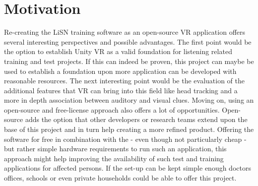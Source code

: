 \documentclass[a4paper,11pt]{article}%
\renewcommand{\\}{\vspace*{0.5\baselineskip} \newline}
\begin{document}
\section{Motivation}
\label{sec:motivation}
Re-creating the \ac{LiSN} training software as an open-source \ac{VR} application offers several interesting perspectives and possible advantages. The first point would be the option to establish Unity \ac{VR} as a valid foundation for listening related training and test projects. If this can indeed be proven, this project can maybe be used to establish a foundation upon more application can be developed with reasonable resources.
\newline
\newline
The next interesting point would be the evaluation of the additional features that \ac{VR} can bring into this field like head tracking and a more in depth association between auditory and visual clues.
\newline
\newline
Moving on, using an open-source and free-license approach also offers a lot of opportunities. Open-source adds the option that other developers or research teams extend upon the base of this project and in turn help creating a more refined product.
\newline
\newline
Offering the software for free in combination with the - even though not particularly cheap - but rather simple hardware requirements to run such an application, this approach might help improving the availability of such test and training applications for affected persons. If the set-up can be kept simple enough doctors offices, schools or even private households could be able to offer this project.
\end{document}
